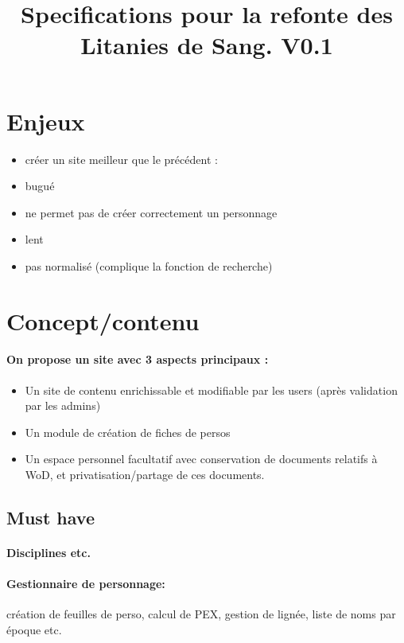 \documentclass[12pt,a4paper]{article}
\title{Specifications pour la refonte des Litanies de Sang. V0.1}
\begin{document}
\maketitle

\section{Enjeux}

\begin{itemize}
\item créer un site meilleur que le précédent :
\item bugué
\item ne permet pas de créer correctement un personnage
\item lent
\item pas normalisé (complique la fonction de recherche) 
\end{itemize}

\section{Concept/contenu}


\paragraph{On propose un site avec 3 aspects principaux :}
\begin{itemize}
  \item Un site de contenu enrichissable et modifiable par les users (après validation par les admins)
  \item Un module de création de fiches de persos
  \item Un espace personnel facultatif avec conservation de documents relatifs à WoD, et privatisation/partage de ces documents.
\end{itemize}

\subsection{Must have}
\paragraph{Disciplines etc.}
\paragraph{Gestionnaire de personnage: } création de feuilles de perso, calcul de PEX, gestion de lignée, liste de noms par époque etc.
\end{document}
